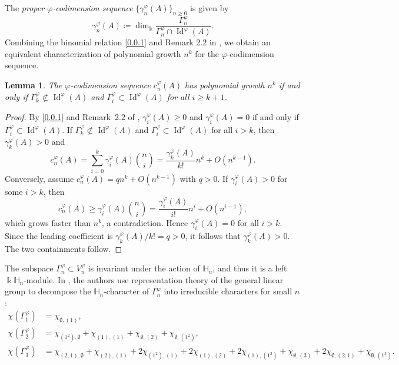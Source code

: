 \documentclass{amsart}
\newtheorem{lem}[thm]{Lemma}
\theoremstyle{definition}
\theoremstyle{remark}
\numberwithin{equation}{section}
\def \Ga{\Gamma}
\def \ga{\gamma}
\def \vp{\varphi}
\def \k{\Bbbk}
\def \H{\mathbb{H}}
\def \Id{\operatorname{Id}}
\def \es{\emptyset}
\begin{document}
	The \emph{proper $\vp$-codimension sequence} $\{\ga_n^\vp(A)\}_{n\geq 0}$ is given by
	\[
	\ga_n^\vp(A) \coloneqq \dim_\k \frac{\Ga_n^\vp}{\Ga_n^\vp \cap \Id^\vp(A)}.
	\]
	Combining the binomial relation \eqref{0.0.1} and Remark 2.2 in \cite{BSSV}, we obtain an equivalent characterization of polynomial growth $n^k$ for the \(\varphi\)-codimension sequence.
	\begin{lem} \label{lem1.2}
		The $\vp$-codimension sequence $c_n^\vp(A)$ has polynomial growth $n^k$ if and only if $\Ga_k^\vp \not\subset \Id^\vp(A)$ and $\Ga_i^\vp \subset \Id^\vp(A)$ for all $i \geq k+1$.
	\end{lem}
	\begin{proof}
		By \eqref{0.0.1} and Remark~2.2 of \cite{BSSV}, $\ga_i^\vp(A)\ge 0$ and $\ga_i^\vp(A)=0$ if and only if $\Ga_i^\vp\subset\Id^\vp(A)$. If $\Ga_k^\vp\not\subset\Id^\vp(A)$ and $\Ga_i^\vp\subset\Id^\vp(A)$ for all $i>k$, then $\ga_k^\vp(A)>0$ and
		\[
		c_n^\vp(A)=\sum_{i=0}^k \ga_i^\vp(A)\binom{n}{i}
		=\frac{\ga_k^\vp(A)}{k!}n^k+O(n^{k-1}).
		\]
		Conversely, assume $c_n^\vp(A)=q n^k+O(n^{k-1})$ with $q>0$. If $\ga_i^\vp(A)>0$ for some $i>k$, then
		\[
		c_n^\vp(A)\ge \ga_i^\vp(A)\binom{n}{i}
		=\frac{\ga_i^\vp(A)}{i!}n^i+O(n^{i-1}),
		\]
		which grows faster than $n^k$, a contradiction. Hence $\ga_i^\vp(A)=0$ for all $i>k$. Since the leading coefficient is $\ga_k^\vp(A)/k!=q>0$, it follows that $\ga_k^\vp(A)>0$. The two containments follow.
	\end{proof}
	The subspace $\Ga_n^\vp \subset V_n^\vp$ is invariant under the action of $\H_n$, and thus it is a left $\k\H_n$-module. In \cite[Section 4]{GSV}, the authors use representation theory of the general linear group to decompose the $\H_n$-character of $\Ga_n^\vp$ into irreducible characters for small $n$:
	\begin{equation*}
		\begin{split}
			\chi(\Ga_1^\vp) &= \chi_{\es, (1)}, \\
			\chi(\Ga_2^\vp) &= \chi_{(1^2),\es} + \chi_{(1),(1)} + \chi_{\es,(2)} + \chi_{\es, (1^2)}, \\
			\chi(\Ga_3^\vp) &= \chi_{(2,1),\es} + \chi_{(2),(1)} + 2\chi_{(1^2),(1)} + 2\chi_{(1),(2)} + 2\chi_{(1),(1^2)} + \chi_{\es, (3)} + 2\chi_{\es, (2,1)} + \chi_{\es, (1^3)}.
		\end{split}
	\end{equation*}
	
\end{document}
